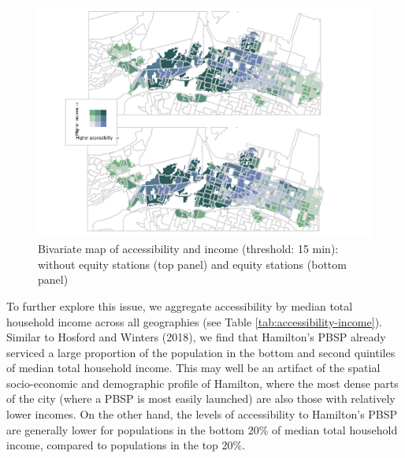 \documentclass[]{elsarticle} %
\begin{document}
\begin{figure}
\includegraphics[width=1\linewidth]{Bike-share-spatial-equity_files/figure-latex/figure-bi-map-threshold-15-1} \caption{\label{fig-bivariate-map-threshold-15}Bivariate map of accessibility and income (threshold: 15 min): without equity stations (top panel) and equity stations (bottom panel)}\label{fig:figure-bi-map-threshold-15}
\end{figure}

To further explore this issue, we aggregate accessibility by median
total household income across all geographies (see Table
\ref{tab:accessibility-income}). Similar to Hosford and Winters (2018),
we find that Hamilton's PBSP already serviced a large proportion of the
population in the bottom and second quintiles of median total household
income. This may well be an artifact of the spatial socio-economic and
demographic profile of Hamilton, where the most dense parts of the city
(where a PBSP is most easily launched) are also those with relatively
lower incomes. On the other hand, the levels of accessibility to
Hamilton's PBSP are generally lower for populations in the bottom 20\%
of median total household income, compared to populations in the top
20\%.
\end{document}
